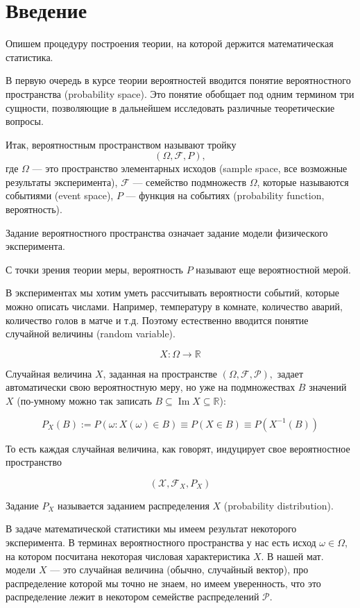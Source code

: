 \documentclass[a4paper,12pt]{article}
\newcommand{\R}{\mathbb{R}}
\DeclareMathOperator{\Ima}{Im}
\newcounter{th-counter}
\begin{document}
\tableofcontents  %

\section*{Введение} 

Опишем процедуру построения теории, на которой держится математическая статистика.

В первую очередь в курсе теории вероятностей вводится понятие вероятностного пространства (probability space). Это понятие обобщает под одним термином три сущности, позволяющие в дальнейшем исследовать различные теоретические вопросы. 

Итак, вероятностным пространством называют тройку
$$(\Omega, \mathcal{F}, P),$$
где $\Omega$ --- это пространство элементарных исходов (sample space, все возможные результаты эксперимента), $\mathcal{F}$ --- семейство подмножеств $\Omega$, которые называются событиями (event space), $P$ --- функция на событиях (probability function, вероятность).

Задание вероятностного пространства означает задание модели физического эксперимента.

С точки зрения теории меры, вероятность $P$ называют еще вероятностной мерой.

В экспериментах мы хотим уметь рассчитывать вероятности событий, которые можно описать числами. Например, температуру в комнате, количество аварий, количество голов в матче и т.д. Поэтому естественно вводится понятие случайной величины (random variable).

$$X: \Omega \rightarrow \R$$

Случайная величина $X$, заданная на пространстве $(\Omega, \mathcal{F}, \mathcal{P}),$ задает автоматически свою вероятностную меру, но уже на подмножествах $B$ значений $X$ (по-умному можно так записать $B \subseteq \Ima X \subseteq \R$):

$$P_X(B) := P(\omega : X(\omega) \in B) \equiv P (X \in B) \equiv P(X^{-1}(B))$$

То есть каждая случайная величина, как говорят, индуцирует свое вероятностное пространство

$$(\mathcal{X}, \mathcal{F}_X, P_X)$$

Задание $P_X$ называется заданием распределения $X$ (probability distribution).

В задаче математической статистики мы имеем результат некоторого эксперимента. В терминах вероятностного пространства у нас есть исход $\omega \in \Omega$, на котором посчитана некоторая числовая характеристика $X$. В нашей мат. модели $X$ --- это случайная величина (обычно, случайный вектор), про распределение которой мы точно не знаем, но имеем уверенность, что это распределение лежит в некотором семействе распределений $\mathcal{P}$.
\end{document}
